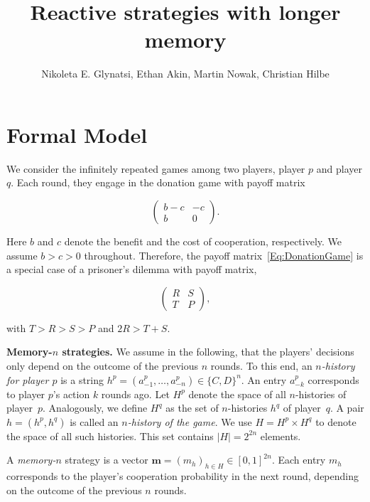 \documentclass{article}
\title{Reactive strategies with longer memory}
\author{Nikoleta E. Glynatsi, Ethan Akin, Martin Nowak, Christian Hilbe}
\date{}
\theoremstyle{definition}
\begin{document}
\maketitle

\section{Formal Model}

We consider the infinitely repeated games among two players, player $p$ and
player $q$. Each round, they engage in the donation game with payoff matrix

\begin{equation} \label{Eq:DonationGame}
\left(
\begin{array}{cc}
b-c	&-c\\
b	&0
\end{array}
\right).
\end{equation}

Here $b$ and $c$ denote the benefit and the cost of cooperation, respectively. 
We assume $b\!>\!c\!>\!0$ throughout.
Therefore, the payoff matrix~\eqref{Eq:DonationGame} is a special case of a
prisoner's dilemma with payoff matrix,

\begin{equation} \label{Eq:PrisonerDilemma}
    \left(
    \begin{array}{cc}
    R & S\\
    T & P
    \end{array}
    \right),
\end{equation}

with $T > R > S > P$ and $2 R > T + S$.

{\bf Memory-$n$ strategies.} We assume in the following, that the players'
decisions only depend on the outcome of the previous $n$ rounds. To this end, an
{\it $n$-history for player $p$} is a string
$h^p=(a^p_{-1},\ldots,a^p_{-n})\!\in\!\{C,D\}^n$. An entry $a^p_{-k}$
corresponds to player $p$'s action $k$ rounds ago. Let $H^p$ denote the space of
all $n$-histories of player~$p$. Analogously, we define $H^q$ as the set of
$n$-histories $h^q$ of player~$q$. A pair $h\!=\!(h^p,h^q)$ is called an {\it
$n$-history of the game}. We use $H=H^p\times H^q$ to denote the space of all
such histories. This set contains $|H|=2^{2n}$ elements.

A {\it memory-$n$} strategy is a vector $\mathbf{m}=(m_h)_{h\in
H}\in[0,1]^{2n}$. Each entry $m_h$ corresponds to the player's cooperation
probability in the next round, depending on the outcome of the previous $n$
rounds.
\end{document}

